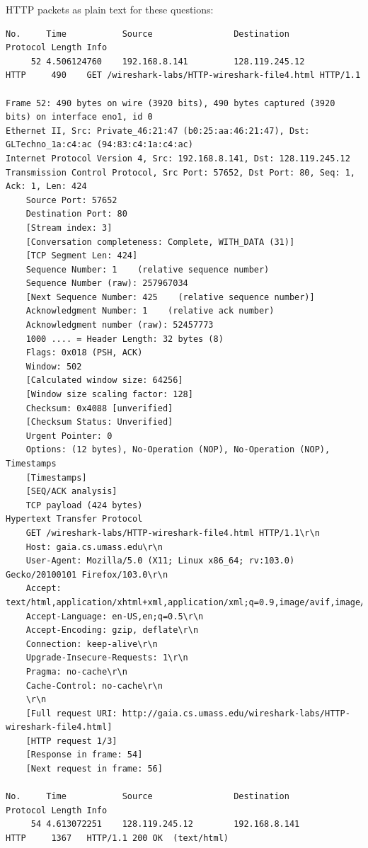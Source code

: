 \documentclass[a4paper,11pt,final]{report}
\begin{document}
HTTP packets as plain text for these questions:
\begin{lstlisting}[breaklines]
No.     Time           Source                Destination           Protocol Length Info
     52 4.506124760    192.168.8.141         128.119.245.12        HTTP     490    GET /wireshark-labs/HTTP-wireshark-file4.html HTTP/1.1 

Frame 52: 490 bytes on wire (3920 bits), 490 bytes captured (3920 bits) on interface eno1, id 0
Ethernet II, Src: Private_46:21:47 (b0:25:aa:46:21:47), Dst: GLTechno_1a:c4:ac (94:83:c4:1a:c4:ac)
Internet Protocol Version 4, Src: 192.168.8.141, Dst: 128.119.245.12
Transmission Control Protocol, Src Port: 57652, Dst Port: 80, Seq: 1, Ack: 1, Len: 424
    Source Port: 57652
    Destination Port: 80
    [Stream index: 3]
    [Conversation completeness: Complete, WITH_DATA (31)]
    [TCP Segment Len: 424]
    Sequence Number: 1    (relative sequence number)
    Sequence Number (raw): 257967034
    [Next Sequence Number: 425    (relative sequence number)]
    Acknowledgment Number: 1    (relative ack number)
    Acknowledgment number (raw): 52457773
    1000 .... = Header Length: 32 bytes (8)
    Flags: 0x018 (PSH, ACK)
    Window: 502
    [Calculated window size: 64256]
    [Window size scaling factor: 128]
    Checksum: 0x4088 [unverified]
    [Checksum Status: Unverified]
    Urgent Pointer: 0
    Options: (12 bytes), No-Operation (NOP), No-Operation (NOP), Timestamps
    [Timestamps]
    [SEQ/ACK analysis]
    TCP payload (424 bytes)
Hypertext Transfer Protocol
    GET /wireshark-labs/HTTP-wireshark-file4.html HTTP/1.1\r\n
    Host: gaia.cs.umass.edu\r\n
    User-Agent: Mozilla/5.0 (X11; Linux x86_64; rv:103.0) Gecko/20100101 Firefox/103.0\r\n
    Accept: text/html,application/xhtml+xml,application/xml;q=0.9,image/avif,image/webp,*/*;q=0.8\r\n
    Accept-Language: en-US,en;q=0.5\r\n
    Accept-Encoding: gzip, deflate\r\n
    Connection: keep-alive\r\n
    Upgrade-Insecure-Requests: 1\r\n
    Pragma: no-cache\r\n
    Cache-Control: no-cache\r\n
    \r\n
    [Full request URI: http://gaia.cs.umass.edu/wireshark-labs/HTTP-wireshark-file4.html]
    [HTTP request 1/3]
    [Response in frame: 54]
    [Next request in frame: 56]

No.     Time           Source                Destination           Protocol Length Info
     54 4.613072251    128.119.245.12        192.168.8.141         HTTP     1367   HTTP/1.1 200 OK  (text/html)


\end{lstlisting}
\end{document}
